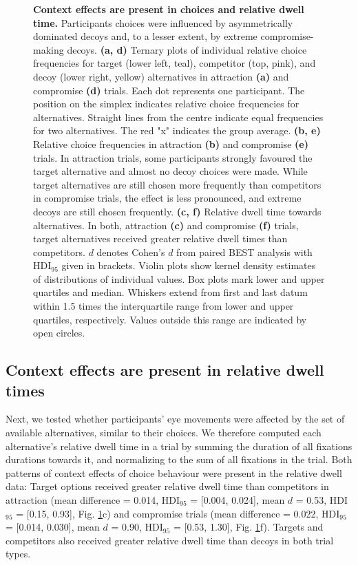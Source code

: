 \documentclass[11pt, a4paper]{article}
\begin{document}
\begin{figure}[bt!]
\begin{centering}
\caption{\textbf{Context effects are present in choices and relative dwell time.} Participants choices were influenced by asymmetrically dominated decoys and, to a lesser extent, by extreme compromise-making decoys. \textbf{(a, d)} Ternary plots of individual relative choice frequencies for target (lower left, teal), competitor (top, pink), and decoy (lower right, yellow) alternatives in attraction \textbf{(a)} and compromise \textbf{(d)} trials. Each dot represents one participant. The position on the simplex indicates relative choice frequencies for alternatives. Straight lines from the centre indicate equal frequencies for two alternatives. The red "x" indicates the group average. \textbf{(b, e)} Relative choice frequencies in attraction \textbf{(b)} and compromise \textbf{(e)} trials. In attraction trials, some participants strongly favoured the target alternative and almost no decoy choices were made. While target alternatives are still chosen more frequently than competitors in compromise trials, the effect is less pronounced, and extreme decoys are still chosen frequently. \textbf{(c, f)} Relative dwell time towards alternatives. In both, attraction \textbf{(c)} and compromise \textbf{(f)} trials, target alternatives received greater relative dwell times than competitors. $d$ denotes Cohen's $d$ from paired BEST analysis with HDI$_{95}$ given in brackets. Violin plots show kernel density estimates of distributions of individual values. Box plots mark lower and upper quartiles and median. Whiskers extend from first and last datum within 1.5 times the interquartile range from lower and upper quartiles, respectively. Values outside this range are indicated by open circles.}
\label{fig:cfx}
\end{centering}
\end{figure}

\subsection*{Context effects are present in relative dwell times}

Next, we tested whether participants' eye movements were affected by the set of available alternatives, similar to their choices. We therefore computed each alternative's relative dwell time in a trial by summing the duration of all fixations durations towards it, and normalizing to the sum of all fixations in the trial. Both patterns of context effects of choice behaviour were present in the relative dwell data: Target options received greater relative dwell time than competitors in attraction (mean difference = 0.014, HDI$_{95}$ = [0.004, 0.024], mean $d$ = 0.53, HDI$_{95}$  = [0.15, 0.93], Fig. \ref{fig:cfx}c) and compromise trials (mean difference = 0.022, HDI$_{95}$  = [0.014, 0.030], mean $d$ = 0.90, HDI$_{95}$  = [0.53, 1.30], Fig. \ref{fig:cfx}f). Targets and competitors also received greater relative dwell time than decoys in both trial types.
\end{document}
